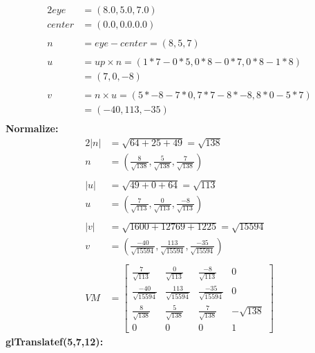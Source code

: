 \documentclass[12pt,fleqn,reqno]{article}
\begin{document}
 \begin{alignat*}{2}
	eye		&= (8.0, 5.0, 7.0)\\
	center	&= (0.0,0.0.0.0)\\
	\\
	n		&= eye -center = (8,5,7)\\
	\\
	u		&= up \times n = (1*7- 0*5, 0*8-0*7, 0*8 - 1*8)\\
			&=(7,0,-8)\\
	\\
	v		&= n \times u = (5*-8 - 7*0, 7*7 -8*-8, 8*0 - 5*7)\\
			&=(-40,113,-35)\\
\end{alignat*}
\textbf{Normalize:}
\begin{alignat*}{2}
	\lvert n\rvert	& = \sqrt{64+25+49} = \sqrt{138} \\
	n	 		&= (\frac{8}{\sqrt{138}}, \frac{5}{\sqrt{138}}, \frac{7}{\sqrt{138}})\\
	\\
	\lvert u\rvert	& = \sqrt{49+0+64} = \sqrt{113}\\
	u			&= (\frac{7}{\sqrt{113}}, \frac{0}{\sqrt{113}}, \frac{-8}{\sqrt{113}})\\
	\\
	\lvert v\rvert	& = \sqrt{1600+12769+1225} = \sqrt{15594}\\
	v			&= (\frac{-40}{\sqrt{15594}}, \frac{113}{\sqrt{15594}}, \frac{-35}{\sqrt{15594}})\\
	\\
	VM &=\begin{bmatrix}
		\frac{7}{\sqrt{113}} & \frac{0}{\sqrt{113}} & \frac{-8}{\sqrt{113}} & 0 \\
		\frac{-40}{\sqrt{15594}} & \frac{113}{\sqrt{15594}} & \frac{-35}{\sqrt{15594}} & 0 \\
		\frac{8}{\sqrt{138}} & \frac{5}{\sqrt{138}} & \frac{7}{\sqrt{138}} & -\sqrt{138} \\
		0 & 0 & 0 & 1
	\end{bmatrix}
\end{alignat*}
\newline
\textbf{glTranslatef(5,7,12):}\\
\end{document}
